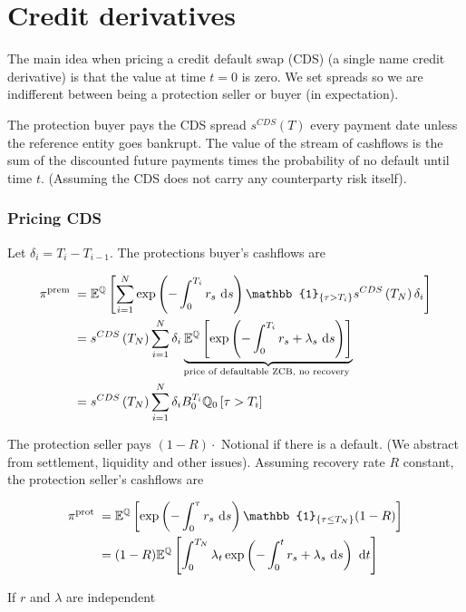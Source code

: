 \chapter{Credit derivatives}
The main idea when pricing a credit default swap (CDS) (a single name credit derivative) is that the value at time $t=0$ is zero. We set spreads so we are indifferent between being a protection seller or buyer (in expectation).

The protection buyer pays the CDS spread $s^{C D S}(T)$ every payment date unless the reference entity goes bankrupt. The value of the stream of cashflows is the sum of the discounted future payments times the probability of no default until time $t$. (Assuming the CDS does not carry any counterparty risk itself).

\subsection{Pricing CDS}
Let $\delta_{i}=T_{i}-T_{i-1}$. The protections buyer's cashflows are

$$
\begin{aligned}
\pi^{\text {prem }} & =\E^{\Q}\left[\sum_{i=1}^{N} \exp \left(-\int_{0}^{T_{i}} r_{s} \d  s\right) \mathbb{1}_{\left\{\tau>T_{i}\right\}} s^{C D S}\left(T_{N}\right) \delta_{i}\right] \\
& =s^{C D S}\left(T_{N}\right) \sum_{i=1}^{N} \delta_{i} \underbrace{\E^{\Q}\left[\exp \left(-\int_{0}^{T_{i}} r_{s}+\lambda_{s} \d  s\right)\right]}_{\text {price of defaultable ZCB, no recovery }} \\
& =s^{C D S}\left(T_{N}\right) \sum_{i=1}^{N} \delta_{i} B_{0}^{T_{i}} \Q_{0}\left[\tau>T_{i}\right]
\end{aligned}
$$

The protection seller pays $(1-R) \cdot$ Notional if there is a default. (We abstract from settlement, liquidity and other issues). Assuming recovery rate $R$ constant, the protection seller's cashflows are

$$
\begin{aligned}
\pi^{\text {prot }} & =\E^{\Q}\left[\exp \left(-\int_{0}^{\tau} r_{s} \d  s\right) \mathbb{1}_{\left\{\tau \leq T_{N}\right\}}(1-R)\right] \\
& =(1-R) \E^{\Q}\left[\int_{0}^{T_{N}} \lambda_{t} \exp \left(-\int_{0}^{t} r_{s}+\lambda_{s} \d  s\right) \d  t\right]
\end{aligned}
$$

If $r$ and $\lambda$ are independent

